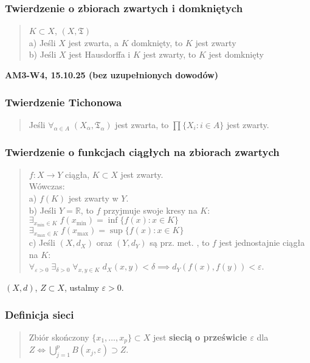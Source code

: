 \documentclass[10pt,a4paper]{article}
\newcommand{\zagadnienie}[3]{%
    \clearpage %
    \noindent\textbf{#1} #2\\
    #3
}
\begin{document}
    \subsubsection*{Twierdzenie o zbiorach zwartych i domkniętych}
    \begin{quote}
    $K \subset X$, $(X, \mathfrak{T})$ \\
    a) Jeśli $X$ jest zwarta, a $K$ domknięty, to $K$ jest zwarty \\
    b) Jeśli $X$ jest Hausdorffa i $K$ jest zwarty, to $K$ jest domknięty
    \end{quote}

\zagadnienie{AM3-W4, 15.10.25 (bez uzupełnionych dowodów)}{}
{
    \subsubsection*{Twierdzenie Tichonowa}
    \begin{quote}
    Jeśli $\forall_{\alpha \in A} \; (X_\alpha, \mathfrak{T}_\alpha)$ jest zwarta, to $\prod \{X_i : i \in A\}$ jest zwarty.
    \end{quote}

    \subsubsection*{Twierdzenie o funkcjach ciągłych na zbiorach zwartych}
    \begin{quote}
    $f: X \to Y$ ciągła, $K \subset X$ jest zwarty. \\
    Wówczas: \\
    a) $f(K)$ jest zwarty w $Y$. \\
    b) Jeśli $Y = \mathbb{R}$, to $f$ przyjmuje swoje kresy na $K$: \\
    $\exists_{x_{\mathrm{min}} \in K} \; f(x_{\mathrm{min}}) = \inf \{f(x) : x \in K\}$ \\
    $\exists_{x_{\mathrm{max}} \in K} \; f(x_{\mathrm{max}}) = \sup \{f(x) : x \in K\}$ \\
    c) Jeśli $(X, d_X)$ oraz $(Y, d_Y)$ są prz. met. , to $f$ jest jednostajnie ciągła na $K$: \\
    $\forall_{\varepsilon > 0} \; \exists_{\delta > 0} \; \forall_{x, y \in K} \; d_X(x, y) < \delta \implies d_Y(f(x), f(y)) < \varepsilon$.
    \end{quote}

    $(X, d)$, $Z \subset X$, ustalmy $\varepsilon > 0$. \\
    \subsubsection*{Definicja sieci}
    \begin{quote}
    Zbiór skończony $\{x_1, \dots, x_p\} \subset X$ jest \textbf{siecią o prześwicie $\varepsilon$} dla \\
    $Z \iff \bigcup_{j=1}^p B(x_j, \varepsilon) \supset Z$.
    \end{quote}

}
\end{document}
